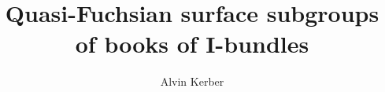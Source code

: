 \documentclass[12pt]{amsart}
\begin{document}
\title{Quasi-Fuchsian surface subgroups of books of I-bundles}

\author{Alvin Kerber}



\maketitle













\end{document}

